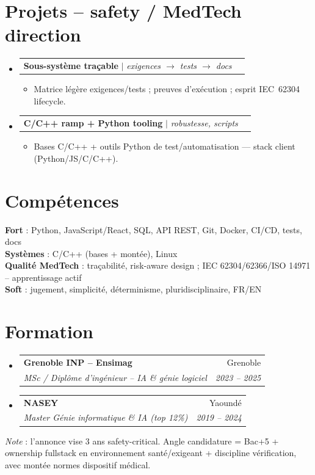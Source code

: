 \documentclass[a4paper,10.5pt]{article}
\makeatletter
\newcommand{\resumeItem}[1]{\item\small{#1}}
\newcommand{\resumeSubheading}[4]{\vspace{2.5pt}\item\begin{tabular*}{0.97\textwidth}[t]{l@{\extracolsep{\fill}}r}\textbf{#1}&{#2}\\\textit{\small #3}&\textit{\small #4}\\\end{tabular*}\vspace{1pt}}
\newcommand{\resumeProjectHeading}[2]{\vspace{1.5pt}\item\begin{tabular*}{0.97\textwidth}{l@{\extracolsep{\fill}}r}\small #1&#2\\\end{tabular*}\vspace{1pt}}
\newcommand{\resumeSubHeadingListStart}{\begin{itemize}[leftmargin=0.08in,label={}]}
\newcommand{\resumeSubHeadingListEnd}{\end{itemize}}
\makeatother
\begin{document}
\section{Projets -- safety / MedTech direction}
\resumeSubHeadingListStart
  \resumeProjectHeading{\textbf{Sous-syst\`eme tra\c{c}able} $|$ \emph{exigences $\rightarrow$ tests $\rightarrow$ docs}}{}
  \begin{itemize}\resumeItem{Matrice l\'eg\`ere exigences/tests ; preuves d'ex\'ecution ; esprit IEC~62304 lifecycle.}\end{itemize}
  \resumeProjectHeading{\textbf{C/C++ ramp + Python tooling} $|$ \emph{robustesse, scripts}}{}
  \begin{itemize}\resumeItem{Bases C/C++ + outils Python de test/automatisation --- stack client (Python/JS/C/C++).}\end{itemize}
\resumeSubHeadingListEnd

\section{Comp\'etences}
\begin{itemize}[leftmargin=0.08in,label={}]\small{\item{
\textbf{Fort} : Python, JavaScript/React, SQL, API REST, Git, Docker, CI/CD, tests, docs \\
\textbf{Syst\`emes} : C/C++ (bases + mont\'ee), Linux \\
\textbf{Qualit\'e MedTech} : tra\c{c}abilit\'e, risk-aware design ; IEC 62304/62366/ISO 14971 -- apprentissage actif \\
\textbf{Soft} : jugement, simplicit\'e, d\'eterminisme, pluridisciplinaire, FR/EN
}}\end{itemize}

\section{Formation}
\resumeSubHeadingListStart
  \resumeSubheading{Grenoble INP -- Ensimag}{Grenoble}{MSc / Dipl\^ome d'ing\'enieur -- IA \& g\'enie logiciel}{2023 -- 2025}
  \resumeSubheading{NASEY}{Yaound\'e}{Master G\'enie informatique \& IA (top 12\%)}{2019 -- 2024}
\resumeSubHeadingListEnd

\vspace{3pt}
\small{\textit{Note} : l'annonce vise 3 ans safety-critical. Angle candidature = Bac+5 + ownership fullstack en environnement sant\'e/exigeant + discipline v\'erification, avec mont\'ee normes dispositif m\'edical.}
\end{document}
